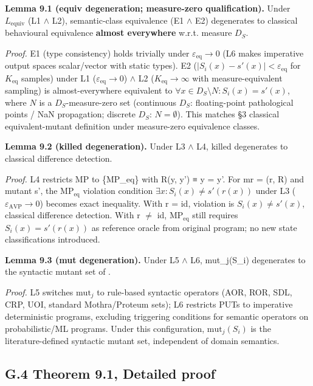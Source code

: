 \documentclass[acmsmall,screen,review]{acmart}
\begin{document}
\textbf{Lemma 9.1 (equiv degeneration; measure-zero
qualification).} Under $L_{\mathrm{equiv}}$ (L1 $\wedge$ L2), semantic-class equivalence
(E1 $\wedge$ E2) degenerates to classical behavioural equivalence
\textbf{almost everywhere} w.r.t. measure $D_S$.

\emph{Proof.} E1 (type consistency) holds trivially under $\varepsilon_{\mathrm{eq}} \to 0$ (L6
makes imperative output spaces scalar/vector with static types). E2
($|S_i(x) - s'(x)| < \varepsilon_{\mathrm{eq}}$ for $K_{\mathrm{eq}}$ samples)
under L1 ($\varepsilon_{\mathrm{eq}} \to 0$) $\wedge$ L2 ($K_{\mathrm{eq}} \to \infty$ with measure-equivalent sampling)
is almost-everywhere equivalent to $\forall x \in D_S \setminus N: S_i(x) = s'(x)$, where
$N$ is a $D_S$-measure-zero set (continuous $D_S$: floating-point
pathological points / NaN propagation; discrete $D_S$: $N = \emptyset$). This
matches \citet{d7c38286734419b52de4262c9802ebdfcf4b9447} §3 classical equivalent-mutant definition
under measure-zero equivalence classes.

\textbf{Lemma 9.2 (killed degeneration).} Under L3 $\wedge$ L4, killed
degenerates to classical difference detection.

\emph{Proof.} L4 restricts MP to \{MP\_eq\} with R(y, y') ≡ y = y'. For
mr = (r, R) and mutant s', the $\mathrm{MP}_{\mathrm{eq}}$ violation condition $\exists x: S_i(x) \neq
s'(r(x))$ under L3 ($\varepsilon_{\mathrm{AVP}} \to 0$) becomes exact inequality. With r = id,
violation is $S_i(x) \neq s'(x)$, classical difference detection. With r
$\neq$ id, $\mathrm{MP}_{\mathrm{eq}}$ still requires $S_i(x) = s'(r(x))$ as reference oracle from
original program; no new state classifications introduced.

\textbf{Lemma 9.3 (mut degeneration).} Under L5 $\wedge$ L6, mut\_j(S\_i)
degenerates to the syntactic mutant set of \citet{d7c38286734419b52de4262c9802ebdfcf4b9447}.

\emph{Proof.} L5 switches $\mathrm{mut}_j$ to rule-based syntactic operators (AOR,
ROR, SDL, CRP, UOI, standard Mothra/Proteum sets); L6 restricts PUTs
to imperative deterministic programs, excluding triggering conditions
for semantic operators on probabilistic/ML programs. Under this
configuration, $\mathrm{mut}_j(S_i)$ is the literature-defined syntactic mutant
set, independent of domain semantics.

\subsection{G.4 Theorem 9.1, Detailed proof}\label{g.4-theorem-9.1-detailed-proof}
\end{document}

